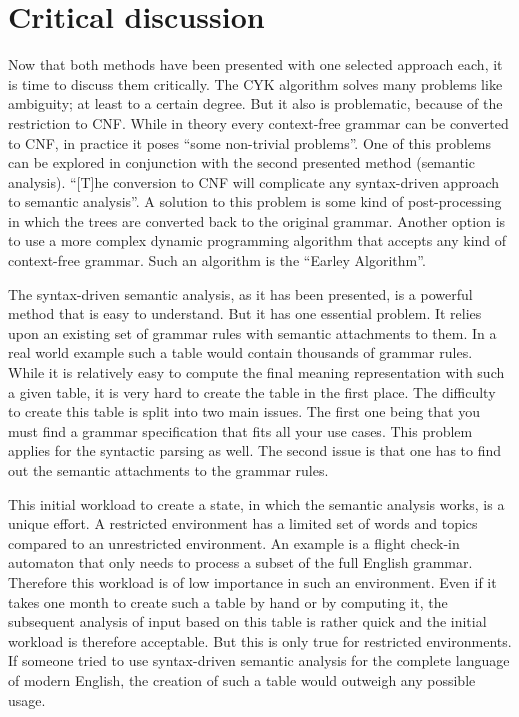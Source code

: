 \documentclass[12pt,twoside]{scrartcl}
\theoremstyle{plain}
\theoremstyle{definition}
\theoremstyle{remark}
\begin{document}
\section{Critical discussion}
\label{sec:critDiscussion}


	Now that both methods have been presented with one selected approach each, it is time to discuss them critically. The CYK algorithm solves many problems like ambiguity; at least to a certain degree. But it also is problematic, because of the restriction to CNF. While in theory every context-free grammar can be converted to CNF, in practice it poses ``some non-trivial problems''\cite[p.~475]{Jurafsky2009b}. One of this problems can be explored in conjunction with the second presented method (semantic analysis). ``[T]he conversion to CNF will complicate any syntax-driven approach to semantic analysis''\cite[p.~475]{Jurafsky2009b}. A solution to this problem is some kind of post-processing in which the trees are converted back to the original grammar.\cite{Jurafsky2009b} Another option is to use a more complex dynamic programming algorithm that accepts any kind of context-free grammar. Such an algorithm is the ``Earley Algorithm''\cite[p.~477]{Jurafsky2009b}.
	
	The syntax-driven semantic analysis, as it has been presented, is a powerful method that is easy to understand. But it has one essential problem. It relies upon an existing set of grammar rules with semantic attachments to them. In a real world example such a table would contain thousands of grammar rules.\cite{Russel2010} While it is relatively easy to compute the final meaning representation with such a given table, it is very hard to create the table in the first place. The difficulty to create this table is split into two main issues. The first one being that you must find a grammar specification that fits all your use cases. This problem applies for the syntactic parsing as well. The second issue is that one has to find out the semantic attachments to the grammar rules.
	
	This initial workload to create a state, in which the semantic analysis works, is a unique effort.\cite{Jurafsky2009} A restricted environment has a limited set of words and topics compared to an unrestricted environment. An example is a flight check-in automaton that only needs to process a subset of the full English grammar. Therefore this workload is of low importance in such an environment. Even if it takes one month to create such a table by hand or by computing it, the subsequent analysis of input based on this table is rather quick and the initial workload is therefore acceptable. But this is only true for restricted environments. If someone tried to use syntax-driven semantic analysis for the complete language of modern English, the creation of such a table would outweigh any possible usage.
	
\end{document}
